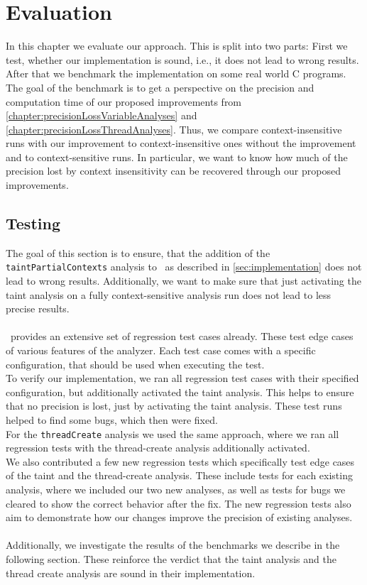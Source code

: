 
\chapter{Evaluation}\label{chapter:evaluation}
  In this chapter we evaluate our approach. This is split into two parts: First we test, whether our implementation is sound, i.e., it does not lead to wrong results. After that we benchmark the implementation on some real world C programs. The goal of the benchmark is to get a perspective on the precision and computation time of our proposed improvements from \autoref{chapter:precisionLossVariableAnalyses} and \autoref{chapter:precisionLossThreadAnalyses}. Thus, we compare context-insensitive runs with our improvement to context-insensitive ones without the improvement and to context-sensitive runs. In particular, we want to know how much of the precision lost by context insensitivity can be recovered through our proposed improvements.

  \section{Testing}
    The goal of this section is to ensure, that the addition of the \texttt{taintPartialContexts} analysis to \gob\ as described in \autoref{sec:implementation} does not lead to wrong results. Additionally, we want to make sure that just activating the taint analysis on a fully context-sensitive analysis run does not lead to less precise results.\\
    \\
    \gob\ provides an extensive set of regression test cases already. These test edge cases of various features of the analyzer. Each test case comes with a specific configuration, that should be used when executing the test.\\
    To verify our implementation, we ran all regression test cases with their specified configuration, but additionally activated the taint analysis. This helps to ensure that no precision is lost, just by activating the taint analysis. These test runs helped to find some bugs, which then were fixed.\\
    For the \texttt{threadCreate} analysis we used the same approach, where we ran all regression tests with the thread-create analysis additionally activated.\\
    We also contributed a few new regression tests which specifically test edge cases of the taint and the thread-create analysis. These include tests for each existing analysis, where we included our two new analyses, as well as tests for bugs we cleared to show the correct behavior after the fix. The new regression tests also aim to demonstrate how our changes improve the precision of existing analyses.\\
    \\
    Additionally, we investigate the results of the benchmarks we describe in the following section. These reinforce the verdict that the taint analysis and the thread create analysis are sound in their implementation.
  
